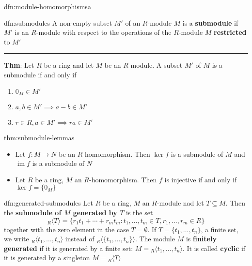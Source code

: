 \documentclass[landscape, 8pt]{extarticle}
\DeclareMathOperator{\im}{im}
\begin{document}
\begin{multicols}{3}
\begin{dfn}{dfn:module-homomorphismsa}{}
\end{dfn}

\begin{dfn}[Submodules]{dfn:submodules}{}
    A non-empty subset $M'$ of an $R$-module $M$ is a \textbf{submodule} if $M'$ is an $R$-module with respect to the operations of the $R$-module $M$ \textbf{restricted} to $M'$

    \noindent\rule{\textwidth}{0.2pt}
    \textbf{Thm}: Let $R$ be a ring and let $M$ be an $R$-module. A subset $M'$ of $M$ is a submodule if and only if
    \begin{enumerate}
        \setlength\itemsep{0em}
        \item $0_{M}\in M'$
        \item $a,b\in M' \implies a - b \in M'$
        \item $r\in R, a\in M' \implies ra\in M'$
    \end{enumerate}
\end{dfn}

\begin{thm}{thm:submodule-lemmas}{}
    \begin{itemize}[leftmargin=*]
        \setlength\itemsep{0em}
        \item Let $f : M\to N$ be an $R$-homomorphism. Then $\ker f$ is a submodule of $M$ and $\im f$ is a submodule of $N$
        \item Let $R$ be a ring, $M$ an $R$-homomorphism. Then $f$ is injective if and only if $\ker f = \{0_{M}\}$
    \end{itemize}
\end{thm}

\begin{dfn}{dfn:generated-submodules}{}
    Let $R$ be a ring, $M$ an $R$-module nad let $T \subseteq M$. Then the \textbf{submodule of $M$ generated by $T$} is the set
    \[{}_{R}\langle T \rangle = \{r_{1}t_{1} +\cdots+ r_{m}t_{m} : t_{1},\dots,t_{m}\in T, r_{1},\dots,r_{m}\in R\}\]
together with the zero element in the case $T = \emptyset$. If $T = \{t_{1},\dots,t_{n}\}$, a finite set, we write ${}_{R}\langle t_{1},\dots,t_{n} \rangle$ instead of ${}_{R}\langle \{t_{1},\dots,t_{n}\} \rangle$. The module $M$ is \textbf{finitely generated} if it is generated by a finite set: $M = {}_{R}\langle t_{1},\dots,t_{n} \rangle$. It is called \textbf{cyclic} if it is generated by a singleton $M = {}_{R}\langle T\rangle$
\end{dfn}


\end{multicols}
\end{document}
